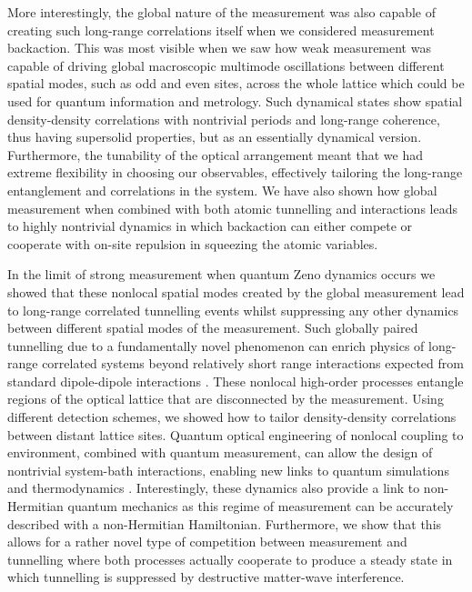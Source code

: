 More interestingly, the global nature of the measurement was also
capable of creating such long-range correlations itself when we
considered measurement backaction. This was most visible when we saw
how weak measurement was capable of driving global macroscopic
multimode oscillations between different spatial modes, such as odd
and even sites, across the whole lattice which could be used for
quantum information and metrology. Such dynamical states show spatial
density-density correlations with nontrivial periods and long-range
coherence, thus having supersolid properties, but as an essentially
dynamical version. Furthermore, the tunability of the optical
arrangement meant that we had extreme flexibility in choosing our
observables, effectively tailoring the long-range entanglement and
correlations in the system. We have also shown how global measurement
when combined with both atomic tunnelling and interactions leads to
highly nontrivial dynamics in which backaction can either compete or
cooperate with on-site repulsion in squeezing the atomic variables.

In the limit of strong measurement when quantum Zeno dynamics occurs
we showed that these nonlocal spatial modes created by the global
measurement lead to long-range correlated tunnelling events whilst
suppressing any other dynamics between different spatial modes of the
measurement. Such globally paired tunnelling due to a fundamentally
novel phenomenon can enrich physics of long-range correlated systems
beyond relatively short range interactions expected from standard
dipole-dipole interactions \cite{sowinski2012, omjyoti2015}. These
nonlocal high-order processes entangle regions of the optical lattice
that are disconnected by the measurement. Using different detection
schemes, we showed how to tailor density-density correlations between
distant lattice sites. Quantum optical engineering of nonlocal
coupling to environment, combined with quantum measurement, can allow
the design of nontrivial system-bath interactions, enabling new links
to quantum simulations \cite{stannigel2013} and thermodynamics
\cite{erez2008}. Interestingly, these dynamics also provide a link to
non-Hermitian quantum mechanics as this regime of measurement can be
accurately described with a non-Hermitian Hamiltonian. Furthermore, we
show that this allows for a rather novel type of competition between
measurement and tunnelling where both processes actually cooperate to
produce a steady state in which tunnelling is suppressed by
destructive matter-wave interference.

